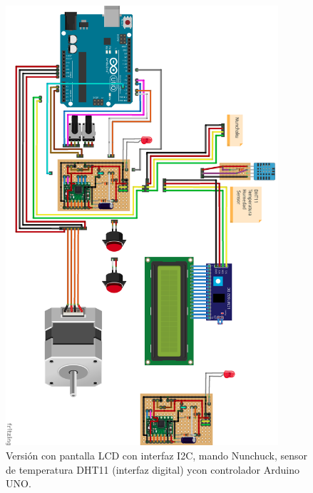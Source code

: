\begin{figure}[h]
	\centering
	\includegraphics[width=0.9\textwidth]{../images/circuito4}
	\caption[Versión 3 del dispositivo]{Versión con pantalla LCD con interfaz I2C, mando Nunchuck, sensor de temperatura DHT11 (interfaz digital) ycon controlador Arduino UNO.}
	\label{circuito4}
\end{figure}






